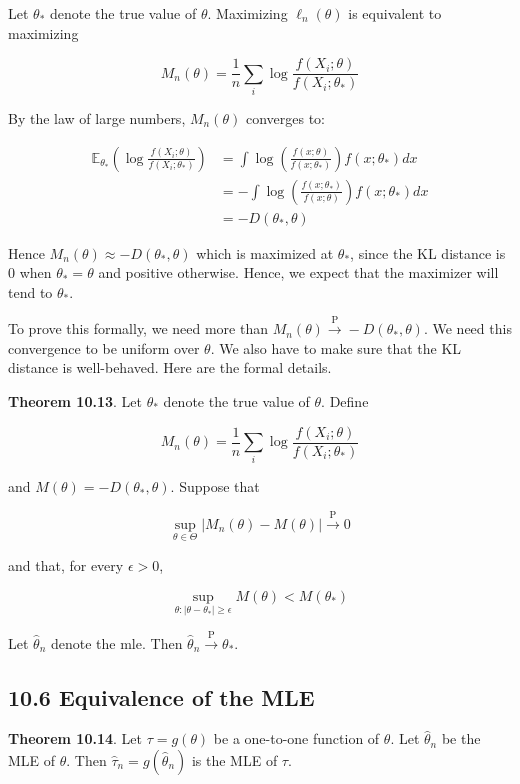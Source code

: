 Let \(\theta_*\) denote the true value of \(\theta\). Maximizing
\(\ell_n(\theta)\) is equivalent to maximizing

\[M_n(\theta) = \frac{1}{n} \sum_i \log \frac{f(X_i; \theta)}{f(X_i; \theta_*)}\]

By the law of large numbers, \(M_n(\theta)\) converges to:

\begin{align}
\mathbb{E}_{\theta_*} \left( \log \frac{f(X_i; \theta)}{f(X_i; \theta_*)} \right)
& = \int \log \left( \frac{f(x; \theta)}{f(x; \theta_*)} \right) f(x; \theta_*) dx \\
& = - \int \log \left( \frac{f(x; \theta_*)}{f(x; \theta)} \right) f(x; \theta_*) dx \\
&= -D(\theta_*, \theta)
\end{align}

Hence \(M_n(\theta) \approx -D(\theta_*, \theta)\) which is maximized at
\(\theta_*\), since the KL distance is 0 when \(\theta_* = \theta\) and
positive otherwise. Hence, we expect that the maximizer will tend to
\(\theta_*\).

To prove this formally, we need more than
\(M_n(\theta) \xrightarrow{\text{P}} -D(\theta_*, \theta)\). We need
this convergence to be uniform over \(\theta\). We also have to make
sure that the KL distance is well-behaved. Here are the formal details.

\textbf{Theorem 10.13}. Let \(\theta_*\) denote the true value of
\(\theta\). Define

\[M_n(\theta) = \frac{1}{n} \sum_i \log \frac{f(X_i; \theta)}{f(X_i; \theta_*)}\]

and \(M(\theta) = -D(\theta_*, \theta)\). Suppose that

\[ \sup _{\theta \in \Theta} |M_n(\theta) - M(\theta)| \xrightarrow{\text{P}} 0 \]

and that, for every \(\epsilon > 0\),

\[ \sup _{\theta : |\theta - \theta_*| \geq \epsilon} M(\theta) < M(\theta_*)\]

Let \(\hat{\theta}_n\) denote the mle. Then
\(\hat{\theta}_n \xrightarrow{\text{P}} \theta_*\).

\subsection{10.6 Equivalence of the
MLE}\label{equivalence-of-the-mle}

\textbf{Theorem 10.14}. Let \(\tau = g(\theta)\) be a one-to-one
function of \(\theta\). Let \(\hat{\theta}_n\) be the MLE of \(\theta\).
Then \(\hat{\tau}_n = g(\hat{\theta}_n)\) is the MLE of \(\tau\).

